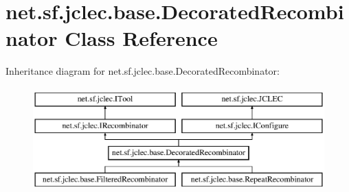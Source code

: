 \hypertarget{classnet_1_1sf_1_1jclec_1_1base_1_1_decorated_recombinator}{\section{net.\-sf.\-jclec.\-base.\-Decorated\-Recombinator Class Reference}
\label{classnet_1_1sf_1_1jclec_1_1base_1_1_decorated_recombinator}
}
Inheritance diagram for net.\-sf.\-jclec.\-base.\-Decorated\-Recombinator\-:\begin{figure}[H]
\begin{center}
\leavevmode
\includegraphics[height=4.000000cm]{classnet_1_1sf_1_1jclec_1_1base_1_1_decorated_recombinator}
\end{center}
\end{figure}
